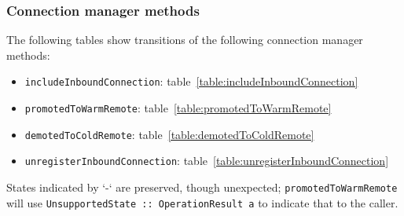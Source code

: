 \subsubsection{Connection manager methods}

The following tables show transitions of the following connection manager methods:
\begin{itemize}
  \item \texttt{includeInboundConnection}: table~\ref{table:includeInboundConnection}
  \item \texttt{promotedToWarmRemote}: table~\ref{table:promotedToWarmRemote}
  \item \texttt{demotedToColdRemote}: table~\ref{table:demotedToColdRemote}
  \item \texttt{unregisterInboundConnection}: table~\ref{table:unregisterInboundConnection}
\end{itemize}

States indicated by `-` are preserved, though unexpected;
\texttt{promotedToWarmRemote} will use \texttt{UnsupportedState ::
OperationResult a} to indicate that to the caller.

